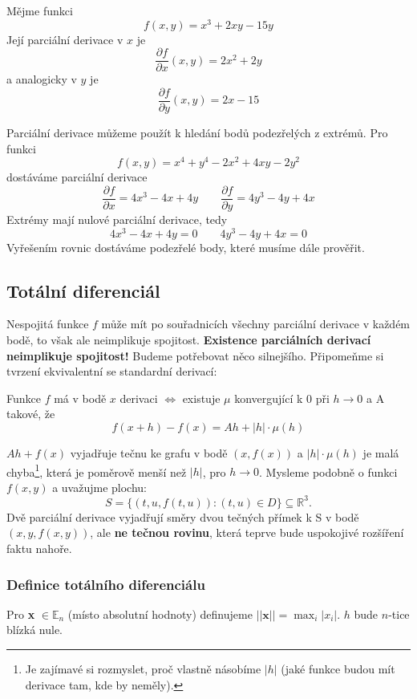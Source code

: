 \documentclass[../main.tex]{subfiles}
\begin{document}
\begin{example}
	Mějme funkci \[f(x, y) = x^3 + 2xy - 15y\]
	Její parciální derivace v \(x\) je \[\frac{\partial f}{\partial x} (x, y) = 2x^2 + 2y\]
	a analogicky v \(y\) je \[\frac{\partial f}{\partial y} (x, y) = 2x - 15\]
\end{example}

\begin{example}
	Parciální derivace můžeme použít k hledání bodů podezřelých z extrémů. Pro funkci \[f(x, y) = x^4 + y^4 - 2x^2 + 4xy - 2y^2\]
	dostáváme parciální derivace \[\frac{\partial f}{\partial x} = 4x^3 - 4x + 4y \qquad \frac{\partial f}{\partial y} = 4y^3 - 4y + 4x\]
	Extrémy mají nulové parciální derivace, tedy \[4x^3 - 4x + 4y = 0 \qquad 4y^3 - 4y + 4x = 0\]
	Vyřešením rovnic dostáváme podezřelé body, které musíme dále prověřit.
\end{example}

\subsection{Totální diferenciál}
Nespojitá funkce $f$ může mít po souřadnicích všechny parciální derivace v každém bodě, to však ale neimplikuje spojitost.
\textbf{Existence parciálních derivací neimplikuje spojitost!}
Budeme potřebovat něco silnejšího. Připomeňme si tvrzení ekvivalentní se standardní derivací:

\begin{lemma}
	Funkce \(f\) má v bodě \(x\) derivaci \(\iff\)  existuje $\mu$ konvergující k 0 při $h \rightarrow 0$ a A takové, že 
	\[f(x+h) - f(x) = Ah + |h| \cdot \mu(h)\]
\end{lemma}

\begin{intuition}
	$Ah + f(x) $ vyjadřuje tečnu ke grafu v bodě $(x,f(x))$ a $|h|\cdot \mu(h)$ je malá chyba\footnote{Je zajímavé si rozmyslet, proč vlastně násobíme \(|h|\) (jaké funkce budou mít derivace tam, kde by neměly).}, která je poměrově menší než \(|h|\), pro \(h \rightarrow 0\).
	Mysleme podobně o funkci $f(x,y)$ a uvažujme plochu:
	\[S = \{(t,u,f(t,u)) : (t,u) \in D\} \subseteq \mathbb{R}^3.\]
	Dvě parciální derivace vyjadřují směry dvou tečných přímek k S v bodě $(x,y,f(x,y))$, ale \textbf{ne tečnou rovinu},
	která teprve bude uspokojivé rozšíření faktu nahoře.
\end{intuition}

\subsubsection{Definice totálního diferenciálu}
Pro \textbf{x} $\in \mathbb{E}_n$ (místo absolutní hodnoty) definujeme \(||\textbf{x}||  = \max_i|x_i|\). $h$ bude $n$-tice blízká nule.
\end{document}
